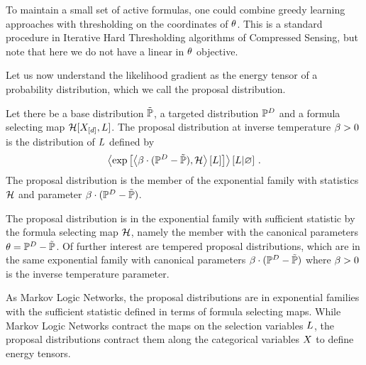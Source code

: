 \begin{remark}
    To maintain a small set of active formulas, one could combine greedy learning approaches with thresholding on the coordinates of $\theta$.
    This is a standard procedure in Iterative Hard Thresholding algorithms of Compressed Sensing, but note that here we do not have a linear in $\theta$ objective.
\end{remark}






Let us now understand the likelihood gradient as the energy tensor of a probability distribution, which we call the proposal distribution.

\begin{definition}
    Let there be a base distribution $\tilde{\mathbb{P}}$, a targeted distribution $\mathbb{P}^{D}$ and a formula selecting map $\mathcal{H}[X_{[d]}, L]$.
    The proposal distribution at inverse temperature $\beta>0$ is the distribution of $L$ defined by
    \begin{align*}
        \left\langle \mathrm{exp}\left[\left\langle \beta\cdot(\mathbb{P}^{D}-\tilde{\mathbb{P}}),\mathcal{H}\right\rangle \left[ L \right]\right] \right\rangle \left[ L | \varnothing \right] \, .
    \end{align*}
    The proposal distribution is the member of the exponential family with statistics $\mathcal{H}$ and parameter $\beta\cdot(\mathbb{P}^{D}-\tilde{\mathbb{P}})$.
\end{definition}


The proposal distribution is in the exponential family with sufficient statistic by the formula selecting map $\mathcal{H}$, namely the member with the canonical parameters $\theta=\mathbb{P}^{D}-\tilde{\mathbb{P}}$.
Of further interest are tempered proposal distributions, which are in the same exponential family with canonical parameters $\beta\cdot(\mathbb{P}^{D}-\tilde{\mathbb{P}})$ where $\beta>0$ is the inverse temperature parameter.

As Markov Logic Networks, the proposal distributions are in exponential families with the sufficient statistic defined in terms of formula selecting maps.
While Markov Logic Networks contract the maps on the selection variables $L$, the proposal distributions contract them along the categorical variables $X$ to define energy tensors.

